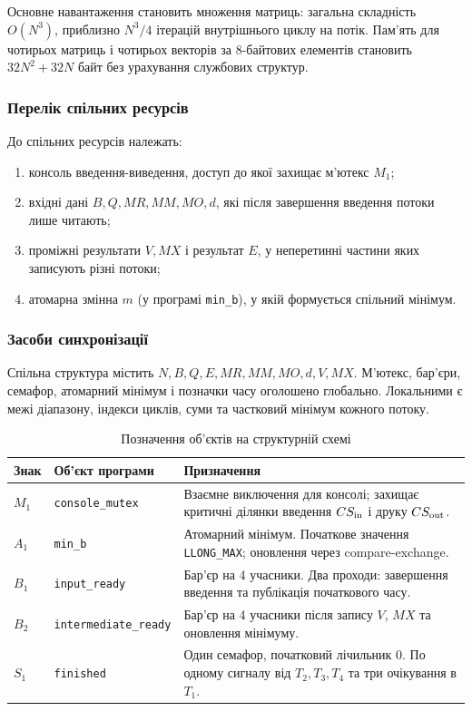 \documentclass[12pt,a4paper]{article}
\begin{document}
Основне навантаження становить множення матриць: загальна складність
$O(N^3)$, приблизно $N^3/4$ ітерацій внутрішнього циклу на потік.
Пам’ять для чотирьох матриць і чотирьох векторів за 8-байтових елементів
становить $32N^2+32N$ байт без урахування службових структур.

\subsubsection*{Перелік спільних ресурсів}

До спільних ресурсів належать:
\begin{enumerate}[leftmargin=*,itemsep=0.15em]
\item консоль введення-виведення, доступ до якої захищає м’ютекс $M_1$;
\item вхідні дані $B,Q,MR,MM,MO,d$, які після завершення введення потоки лише читають;
\item проміжні результати $V,MX$ і результат $E$, у неперетинні частини яких записують різні потоки;
\item атомарна змінна $m$ (у програмі \texttt{min\_b}), у якій формується спільний мінімум.
\end{enumerate}

\subsubsection*{Засоби синхронізації}

Спільна структура містить $N,B,Q,E,MR,MM,MO,d,V,MX$.
М’ютекс, бар’єри, семафор, атомарний мінімум і позначки часу оголошено
глобально. Локальними є межі діапазону, індекси циклів, суми та
частковий мінімум кожного потоку.

\begin{table}[H]
\centering\small\renewcommand{\arraystretch}{1.2}
\begin{tabular}{|p{1cm}|p{4.1cm}|p{9.3cm}|}\hline
\textbf{Знак} & \textbf{Об’єкт програми} & \textbf{Призначення}\\\hline
$M_1$ & \texttt{console\_mutex} & Взаємне виключення для консолі; захищає критичні ділянки введення $CS_{\rm in}$ і друку $CS_{\rm out}$.\\\hline
$A_1$ & \texttt{min\_b} & Атомарний мінімум. Початкове значення \texttt{LLONG\_MAX}; оновлення через compare-exchange.\\\hline
$B_1$ & \texttt{input\_ready} & Бар’єр на 4 учасники. Два проходи: завершення введення та публікація початкового часу.\\\hline
$B_2$ & \texttt{intermediate\_ready} & Бар’єр на 4 учасники після запису $V$, $MX$ та оновлення мінімуму.\\\hline
$S_1$ & \texttt{finished} & Один семафор, початковий лічильник 0. По одному сигналу від $T_2,T_3,T_4$ та три очікування в $T_1$.\\\hline
\end{tabular}
\caption{Позначення об’єктів на структурній схемі}
\label{tab:sync}
\end{table}
\end{document}
